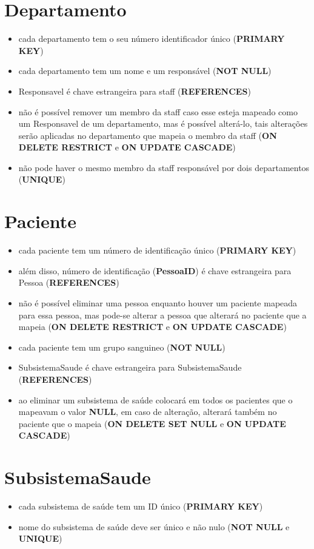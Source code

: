 \documentclass[article, a4paper, 12pt, oneside]{memoir}
\begin{document}
\section*{Departamento}
\begin{itemize}
	\item cada departamento tem o seu número identificador único (\textbf{PRIMARY KEY})
	\item cada departamento tem um nome e um responsável (\textbf{NOT NULL})
	\item Responsavel é chave estrangeira para staff (\textbf{REFERENCES})
	\item não é possível remover um membro da staff caso esse esteja mapeado como um Responsavel de um departamento, mas é possível alterá-lo, tais alterações serão aplicadas no departamento que mapeia o membro da staff (\textbf{ON DELETE RESTRICT} e \textbf{ON UPDATE CASCADE})
	\item não pode haver o mesmo membro da staff responsável por dois departamentos (\textbf{UNIQUE})
\end{itemize}

\section*{Paciente}
\begin{itemize}
	\item cada paciente tem um número de identificação único (\textbf{PRIMARY KEY})
	\item além disso, número de identificação (\textbf{PessoaID}) é chave estrangeira para Pessoa (\textbf{REFERENCES})
	\item não é possível eliminar uma pessoa enquanto houver um paciente mapeada para essa pessoa, mas pode-se alterar a pessoa que alterará no paciente que a mapeia (\textbf{ON DELETE RESTRICT} e \textbf{ON UPDATE CASCADE})
	\item cada paciente tem um grupo sanguineo (\textbf{NOT NULL})
	\item SubsistemaSaude é chave estrangeira para SubsistemaSaude (\textbf{REFERENCES})
	\item ao eliminar um subsistema de saúde colocará em todos os pacientes que o mapeavam o valor \textbf{NULL}, em caso de alteração, alterará também no paciente que o mapeia (\textbf{ON DELETE SET NULL} e \textbf{ON UPDATE CASCADE})
\end{itemize}

\section*{SubsistemaSaude}
\begin{itemize}
	\item cada subsistema de saúde tem um ID único (\textbf{PRIMARY KEY})
	\item nome do subsistema de saúde deve ser único e não nulo (\textbf{NOT NULL} e \textbf{UNIQUE})
\end{itemize}
\end{document}
